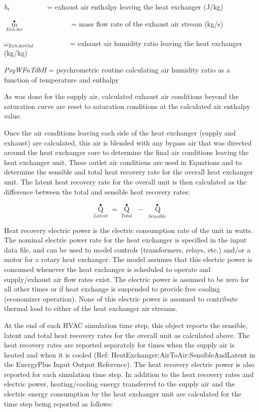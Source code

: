 \emph{h\(_{t}\)}~~~~~~~~~~ = exhaust air enthalpy leaving the heat exchanger (J/kg)

\({\mathop m\limits^ \bullet_{ExhAir}}\) ~~~~~~~~~~~~ = mass flow rate of the exhaust air stream (kg/s)

\({\omega_{ExhAirOut}}\) ~~~~~~~~~ = exhaust air humidity ratio leaving the heat exchanger (kg/kg)

\emph{PsyWFnTdbH} = psychrometric routine calculating air humidity ratio as a function of temperature and enthalpy

As was done for the supply air, calculated exhaust air conditions beyond the saturation curve are reset to saturation conditions at the calculated air enthalpy value.

Once the air conditions leaving each side of the heat exchanger (supply and exhaust) are calculated, this air is blended with any bypass air that was directed around the heat exchanger core to determine the final air conditions leaving the heat exchanger unit. These outlet air conditions are used in Equations and to determine the sensible and total heat recovery rate for the overall heat exchanger unit. The latent heat recovery rate for the overall unit is then calculated as the difference between the total and sensible heat recovery rates:

\begin{equation}
{\mathop Q\limits^ \bullet_{Latent}} = {\mathop Q\limits^ \bullet_{Total}}\,\, - \,{\mathop {\,Q}\limits^ \bullet_{Sensible}}
\end{equation}

Heat recovery electric power is the electric consumption rate of the unit in watts. The nominal electric power rate for the heat exchanger is specified in the input data file, and can be used to model controls (transformers, relays, etc.) and/or a motor for a rotary heat exchanger. The model assumes that this electric power is consumed whenever the heat exchanger is scheduled to operate and supply/exhaust air flow rates exist. The electric power is assumed to be zero for all other times or if heat exchange is suspended to provide free cooling (economizer operation). None of this electric power is assumed to contribute thermal load to either of the heat exchanger air streams.

At the end of each HVAC simulation time step, this object reports the sensible, latent and total heat recovery rates for the overall unit as calculated above. The heat recovery rates are reported separately for times when the supply air is heated and when it is cooled (Ref: HeatExchanger:AirToAir:SensibleAndLatent in the EnergyPlus Input Output Reference). The heat recovery electric power is also reported for each simulation time step. In addition to the heat recovery rates and electric power, heating/cooling energy transferred to the supply air and the electric energy consumption by the heat exchanger unit are calculated for the time step being reported as follows:

